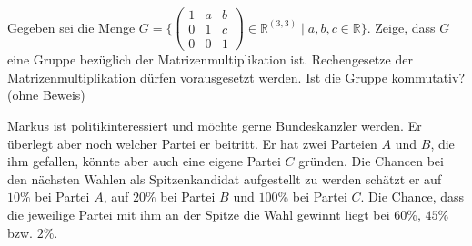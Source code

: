 \documentclass[10pt, a4paper]{exam}
\begin{document}
\begin{questions}

  \question Gegeben sei die Menge $G=\{ \begin{pmatrix} 1&a&b\\0&1&c\\0&0&1 \end{pmatrix} \in\mathbb{R}^{(3,3)}\mid a,b,c\in\mathbb{R}\}$. Zeige, dass $G$ eine Gruppe bezüglich der Matrizenmultiplikation ist. Rechengesetze der Matrizenmultiplikation dürfen vorausgesetzt werden. Ist die Gruppe kommutativ? (ohne Beweis)
  \begin{solution}
  \end{solution}

  \question Markus ist politikinteressiert und möchte gerne Bundeskanzler werden. Er überlegt aber noch welcher Partei er beitritt. Er hat zwei Parteien $A$ und $B$, die ihm gefallen, könnte aber auch eine eigene Partei $C$ gründen. Die Chancen bei den nächsten Wahlen als Spitzenkandidat aufgestellt zu werden schätzt er auf $10\%$ bei Partei $A$, auf $20\%$ bei Partei $B$ und $100\%$ bei Partei $C$. Die Chance, dass die jeweilige Partei mit ihm an der Spitze die Wahl gewinnt liegt bei $60\%$, $45\%$ bzw. $2\%$.
  \begin{parts}

\end{parts}
\end{questions}
\end{document}
